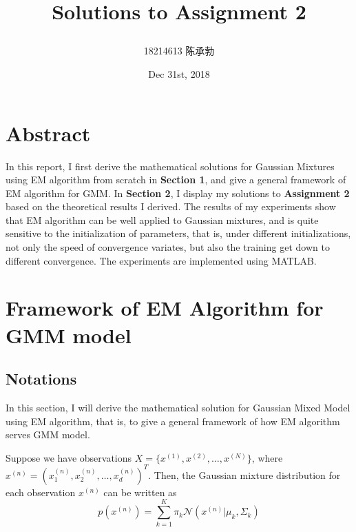 \documentclass{article}
\title{
	\begin{LARGE}
		\textbf{Solutions to Assignment 2}
	\end{LARGE}
	}
\author{18214613 陈承勃}
\date{Dec 31st, 2018}
\begin{document}
\begin{CJK}{UTF8}{gbsn}
\maketitle
\end{CJK}
\begin{spacing}{1.5} %

\section*{Abstract}
In this report, I first derive the mathematical solutions for Gaussian Mixtures using EM algorithm from scratch in \textbf{Section 1}, and give a general framework of EM algorithm for GMM. In \textbf{Section 2}, I display my solutions to \textbf{Assignment 2} based on the theoretical results I derived. The results of my experiments show that EM algorithm can be well applied to Gaussian mixtures, and is quite sensitive to the initialization of parameters, that is, under different initializations, not only the speed of convergence variates, but also the training get down to different convergence. The experiments are implemented using MATLAB.

\section{Framework of EM Algorithm for GMM model}
\subsection{Notations}
In this section, I will derive the mathematical solution for Gaussian Mixed Model using EM algorithm, that is, to give a general framework of how EM algorithm serves GMM model. 

Suppose we have observations $X = \{x^{(1)}, x^{(2)}, \dots, x^{(N)}\}$, where $x^{(n)}=(x^{(n)}_1, x^{(n)}_2, \dots, x^{(n)}_d)^T$. Then, the Gaussian mixture distribution for each observation $x^{(n)}$ can be written as
\begin{equation}
p(x^{(n)}) = \sum_{k=1}^{K}\pi_k \mathcal{N}(x^{(n)}|\mu_k, \Sigma_k)
\end{equation}


\end{spacing}
\end{document}
